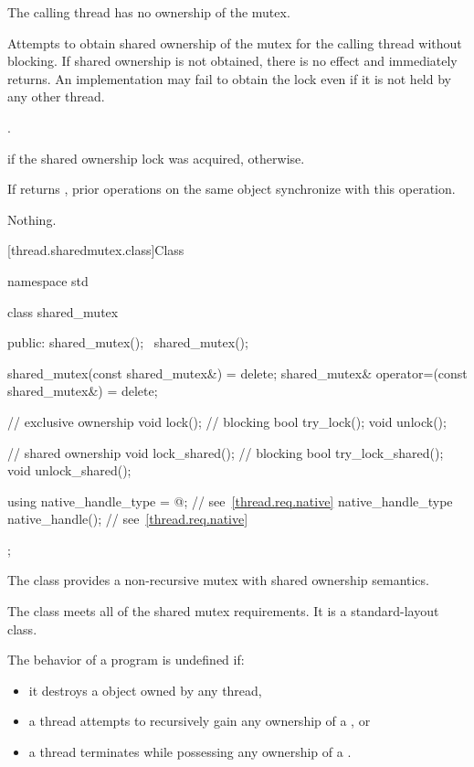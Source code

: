 \begin{itemdescr}
\pnum
\expects
The calling thread has no ownership of the mutex.

\pnum
\effects
Attempts to obtain shared ownership of the mutex for the calling
thread without blocking. If shared ownership is not obtained, there is no
effect and  immediately returns. An implementation
may fail to obtain the lock even if it is not held by any other thread.

\pnum
\returntype {}.

\pnum
\returns
{} if the shared ownership lock was acquired, 
otherwise.

\pnum
\sync
If  returns , prior 
operations on the same object synchronize with this
operation.

\pnum
\throws
Nothing.
\end{itemdescr}

[thread.sharedmutex.class]{Class }

%
\begin{codeblock}
namespace std {
  class shared_mutex {
  public:
    shared_mutex();
    ~shared_mutex();

    shared_mutex(const shared_mutex&) = delete;
    shared_mutex& operator=(const shared_mutex&) = delete;

    // exclusive ownership
    void lock();                // blocking
    bool try_lock();
    void unlock();

    // shared ownership
    void lock_shared();         // blocking
    bool try_lock_shared();
    void unlock_shared();

    using native_handle_type = @\impdefnc@;          // see~\ref{thread.req.native}
    native_handle_type native_handle();                         // see~\ref{thread.req.native}
  };
}
\end{codeblock}

\pnum
The class  provides a non-recursive mutex
with shared ownership semantics.

\pnum
The class  meets
all of the shared mutex requirements.
It is a standard-layout class.

\pnum
The behavior of a program is undefined if:
\begin{itemize}
\item it destroys a  object owned by any thread,
\item a thread attempts to recursively gain any ownership of a , or
\item a thread terminates while possessing any ownership of a .
\end{itemize}

